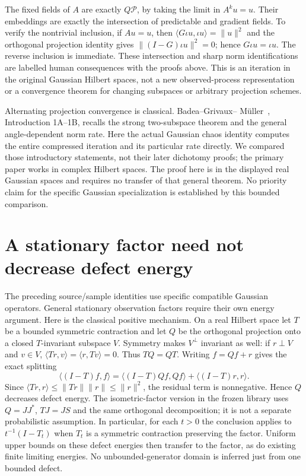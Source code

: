 \documentclass[11pt]{article}
\begin{document}
The fixed fields of $A$ are exactly $Q\mathcal P$, by taking
the limit in $A^ku=u$. Their embeddings are exactly the
intersection of predictable and gradient fields. To verify the
nontrivial inclusion, if $Au=u$, then
$\langle G\iota u,\iota u\rangle=\|u\|^2$ and the
orthogonal projection identity gives
$\|(I-G)\iota u\|^2=0$; hence $G\iota u=\iota u$.
The reverse inclusion is immediate. These intersection and sharp
norm identifications are labelled human consequences with the
proofs above. This is an iteration in the original Gaussian Hilbert
spaces, not a new observed-process representation or a convergence
theorem for changing subspaces or arbitrary projection schemes.

Alternating projection convergence is classical. Badea--Grivaux--
M\"uller~\cite{BGM}, Introduction 1A--1B, recalls the strong
two-subspace theorem and the general angle-dependent norm rate.
Here the actual Gaussian chaos identity computes the entire
compressed iteration and its particular rate directly. We compared
those introductory statements, not their later dichotomy proofs;
the primary paper works in complex Hilbert spaces. The proof here
is in the displayed real Gaussian spaces and requires no transfer
of that general theorem. No priority claim for the specific Gaussian
specialization is established by this bounded comparison.

\section{A stationary factor need not decrease defect energy}
The preceding source/sample identities use specific compatible Gaussian
operators. General stationary observation factors require their own
energy argument. Here is the classical positive mechanism. On a real
Hilbert space let $T$ be a bounded symmetric contraction and let $Q$ be
the orthogonal projection onto a closed $T$-invariant subspace $V$.
Symmetry makes $V^\perp$ invariant as well: if $r\perp V$ and $v\in V$,
$\langle Tr,v\rangle=\langle r,Tv\rangle=0$. Thus $TQ=QT$.
Writing $f=Qf+r$ gives the exact splitting
\begin{equation}\label{eq:defectsplit}
 \langle(I-T)f,f\rangle
 =\langle(I-T)Qf,Qf\rangle+\langle(I-T)r,r\rangle.
\end{equation}
Since $\langle Tr,r\rangle\leq\|Tr\|\|r\|\leq\|r\|^2$,
the residual term is nonnegative. Hence $Q$ decreases defect energy.
The isometric-factor version in the frozen library uses $Q=JJ^*$,
$TJ=JS$ and the same orthogonal decomposition; it is not a separate
probabilistic assumption. In particular, for each $t>0$ the conclusion
applies to $t^{-1}(I-T_t)$ when $T_t$ is a symmetric contraction
preserving the factor. Uniform upper bounds on these defect energies
then transfer to the factor, as do existing finite limiting energies.
No unbounded-generator domain is inferred just from one bounded defect.
\end{document}
